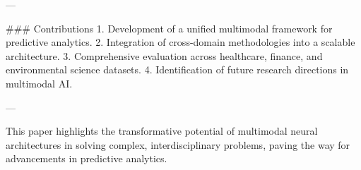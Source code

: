 ---

### Contributions  
1. Development of a unified multimodal framework for predictive analytics.  
2. Integration of cross-domain methodologies into a scalable architecture.  
3. Comprehensive evaluation across healthcare, finance, and environmental science datasets.  
4. Identification of future research directions in multimodal AI.  

---

This paper highlights the transformative potential of multimodal neural architectures in solving complex, interdisciplinary problems, paving the way for advancements in predictive analytics.